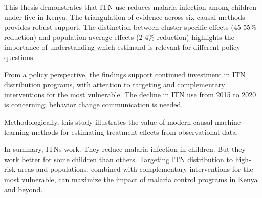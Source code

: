 This thesis demonstrates that ITN use reduces malaria infection among children under five in Kenya. The triangulation of evidence across six causal methods provides robust support. The distinction between cluster-specific effects (45-55\% reduction) and population-average effects (2-4\% reduction) highlights the importance of understanding which estimand is relevant for different policy questions.

From a policy perspective, the findings support continued investment in ITN distribution programs, with attention to targeting and complementary interventions for the most vulnerable. The decline in ITN use from 2015 to 2020 is concerning; behavior change communication is needed.

Methodologically, this study illustrates the value of modern causal machine learning methods for estimating treatment effects from observational data.

In summary, ITNs work. They reduce malaria infection in children. But they work better for some children than others. Targeting ITN distribution to high-risk areas and populations, combined with complementary interventions for the most vulnerable, can maximize the impact of malaria control programs in Kenya and beyond.